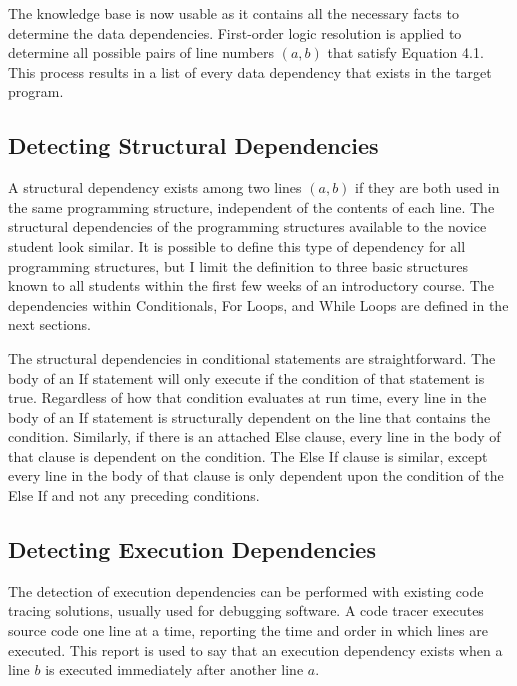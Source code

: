 The knowledge base is now usable as it contains all the necessary facts to determine the data dependencies. First-order logic resolution is applied to determine all possible pairs of line numbers $(a,b)$ that satisfy Equation 4.1. This process results in a list of every data dependency that exists in the target program.

\subsection{Detecting Structural Dependencies}
A structural dependency exists among two lines $(a,b)$ if they are both used in the same programming structure, independent of the contents of each line. The structural dependencies of the programming structures available to the novice student look similar. It is possible to define this type of dependency for all programming structures, but I limit the definition to three basic structures known to all students within the first few weeks of an introductory course. The dependencies within Conditionals, For Loops, and While Loops are defined in the next sections.

The structural dependencies in conditional statements are straightforward. The body of an If statement will only execute if the condition of that statement is true. Regardless of how that condition evaluates at run time, every line in the body of an If statement is structurally dependent on the line that contains the condition. Similarly, if there is an attached Else clause, every line in the body of that clause is dependent on the condition. The Else If clause is similar, except every line in the body of that clause is only dependent upon the condition of the Else If and not any preceding conditions.


\subsection{Detecting Execution Dependencies}
The detection of execution dependencies can be performed with existing code tracing solutions, usually used for debugging software. A code tracer executes source code one line at a time, reporting the time and order in which lines are executed. This report is used to say that an execution dependency exists when a line $b$ is executed immediately after another line $a$.


